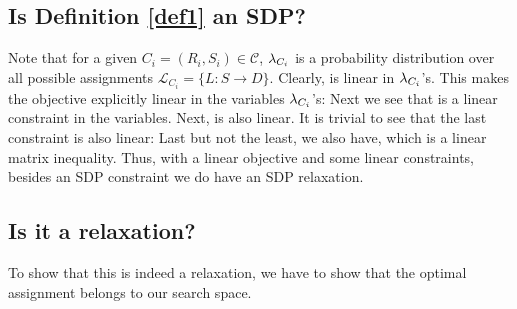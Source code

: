 \subsection{Is Definition \ref{def1} an SDP?}

Note that for a given $C_i =(R_i, S_i) \in \mathcal{C}$, $\lambda_{C_i}$ is a probability distribution over all possible assignments $\mathcal{L}_{C_i} = \{L: S \rightarrow D\}$. Clearly,  
is linear in $\lambda_{C_i}$'s.
This makes the objective explicitly linear in the variables $\lambda_{C_i}$'s:
Next we see that 
is a linear constraint in the variables. Next, 
is also linear. 
It is trivial to see that the last constraint is also linear:
Last but not the least, we also have, 
which is a linear matrix inequality. Thus, with a linear objective and some linear constraints, besides an SDP constraint we do have an SDP relaxation.

\subsection{Is it a relaxation?}
To show that this is indeed a relaxation, we have to show that the optimal assignment belongs to our search space. 

